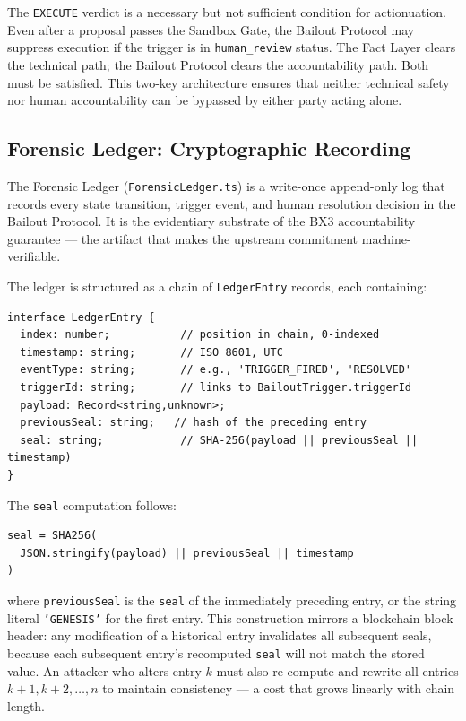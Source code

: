 The \texttt{EXECUTE} verdict is a necessary but not sufficient condition for
actionuation.  Even after a proposal passes the Sandbox Gate, the Bailout Protocol
may suppress execution if the trigger is in \texttt{human\_review} status.  The Fact
Layer clears the technical path; the Bailout Protocol clears the accountability path.
Both must be satisfied.  This two-key architecture ensures that neither technical
safety nor human accountability can be bypassed by either party acting alone.

\subsection{Forensic Ledger: Cryptographic Recording}

The Forensic Ledger (\texttt{ForensicLedger.ts}) is a write-once append-only log
that records every state transition, trigger event, and human resolution decision
in the Bailout Protocol.  It is the evidentiary substrate of the BX3 accountability
guarantee — the artifact that makes the upstream commitment machine-verifiable.

The ledger is structured as a chain of \texttt{LedgerEntry} records, each containing:

\begin{verbatim}
interface LedgerEntry {
  index: number;           // position in chain, 0-indexed
  timestamp: string;       // ISO 8601, UTC
  eventType: string;       // e.g., 'TRIGGER_FIRED', 'RESOLVED'
  triggerId: string;       // links to BailoutTrigger.triggerId
  payload: Record<string,unknown>;
  previousSeal: string;   // hash of the preceding entry
  seal: string;            // SHA-256(payload || previousSeal || timestamp)
}
\end{verbatim}

The \texttt{seal} computation follows:

\begin{verbatim}
seal = SHA256(
  JSON.stringify(payload) || previousSeal || timestamp
)
\end{verbatim}

where \texttt{previousSeal} is the \texttt{seal} of the immediately preceding entry,
or the string literal \texttt{'GENESIS'} for the first entry.  This construction
mirrors a blockchain block header: any modification of a historical entry invalidates
all subsequent seals, because each subsequent entry's recomputed \texttt{seal} will
not match the stored value.  An attacker who alters entry $k$ must also re-compute
and rewrite all entries $k + 1, k + 2, \ldots, n$ to maintain consistency — a
cost that grows linearly with chain length.

